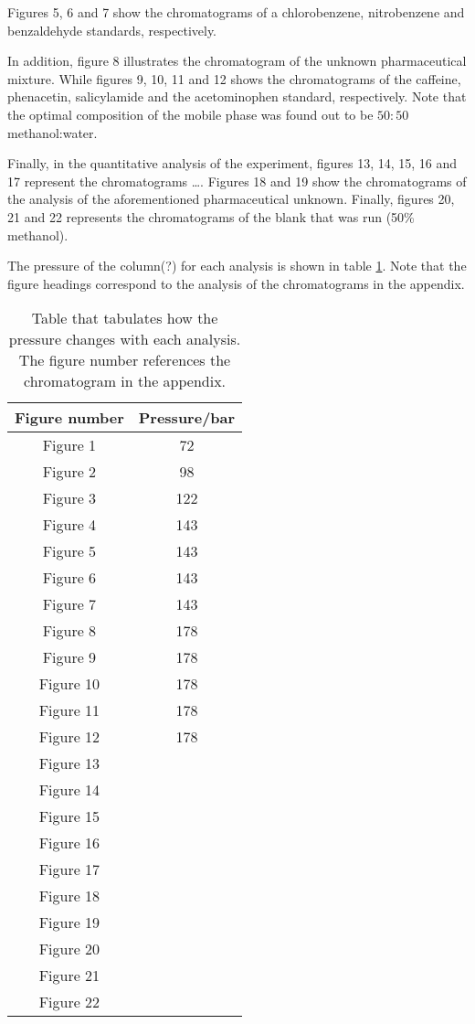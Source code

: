 \documentclass[a4paper, 12pt]{article}
\begin{document}
Figures 5, 6 and 7 show the chromatograms of a chlorobenzene, nitrobenzene and benzaldehyde standards, respectively.

In addition, figure 8 illustrates the chromatogram of the unknown pharmaceutical mixture. While figures 9, 10, 11 and 12 shows the chromatograms of the caffeine, phenacetin, salicylamide and the acetominophen standard, respectively. Note that the optimal composition of the mobile phase was found out to be $50:50$ methanol:water.

Finally, in the quantitative analysis of the experiment, figures 13, 14, 15, 16 and 17 represent the chromatograms \dots{}. Figures 18 and 19 show the chromatograms of the analysis of the aforementioned pharmaceutical unknown. Finally, figures 20, 21 and 22 represents the chromatograms of the blank that was run (50\% methanol).

The pressure of the column(?) for each analysis is shown in table \ref{tab-pressure}. Note that the figure headings correspond to the analysis of the chromatograms in the appendix.

\begin{table}[h!]
	\centering
	\begin{tabular}{|c|c|}
		\hline
		Figure number & Pressure/bar\\
		\hline
		Figure 1  & 72 \\ 
		\hline
		Figure 2 & 98 \\
		\hline
		Figure 3 & 122 \\
		\hline
		Figure 4 & 143 \\
		\hline
		Figure 5 & 143 \\
		\hline
		Figure 6 & 143 \\
		\hline
		Figure 7 & 143 \\
		\hline
		Figure 8 & 178 \\
		\hline
		Figure 9 & 178 \\
		\hline
		Figure 10 & 178 \\
		\hline
		Figure 11 & 178 \\
		\hline
		Figure 12 & 178 \\
		\hline
		Figure 13 & \\
		\hline
		Figure 14 & \\
		\hline
		Figure 15 & \\
		\hline
		Figure 16 & \\
		\hline
		Figure 17 & \\
		\hline
		Figure 18 & \\
		\hline
		Figure 19 & \\
		\hline
		Figure 20 & \\
		\hline
		Figure 21 & \\
		\hline
		Figure 22 &  \\ 
		\hline
	\end{tabular}
	\caption{Table that tabulates how the pressure changes with each analysis. The figure number references the chromatogram in the appendix.}
	\label{tab-pressure}
\end{table}
\end{document}
